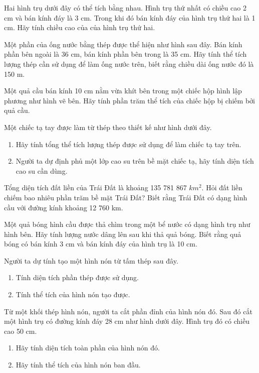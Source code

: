 \documentclass[%
    fontsize=12pt,%
    chapterprefix=false,%
    open=right,%
    twoside=false,%
    numbers=noenddot,%
    headings=optiontohead,%
    final,%
    DIV=15,%
    parskip=half %
]{scrbook}
\begin{document}
\begin{tuluan}
\item Hai hình trụ dưới đây có thể tích bằng nhau. Hình trụ thứ nhất có chiều cao 2 cm và bán kính đáy là 3 cm. Trong khi đó bán kính đáy của hình trụ thứ hai là 1 cm. Hãy tính chiều cao của của hình trụ thứ hai.

\item Một phần của ống nước bằng thép được thể hiện như hình sau đây. Bán kính phần bên ngoài là 36 cm, bán kính phần bên trong là 35 cm. Hãy tính thể tích lượng thép cần sử dụng để làm ống nước trên, biết rằng chiều dài ống nước đó là 150 m.

\item Một quả cầu bán kính 10 cm nằm vừa khít bên trong một chiếc hộp hình lập phương như hình vẽ bên. Hãy tính phần trăm thể tích của chiếc hộp bị chiếm bởi quả cầu.

\item Một chiếc tạ tay được làm từ thép theo thiết kế như hình dưới đây.
\begin{enumerate}[label=\alph*)]
  \item[a)] Hãy tính tổng thể tích lượng thép được sử dụng để làm chiếc tạ tay trên.
  \item[b)] Người ta dự định phủ một lớp cao su trên bề mặt chiếc tạ, hãy tính diện tích cao su cần dùng.
\end{enumerate}

\item Tổng diện tích đất liền của Trái Đất là khoảng 135 781 867 $km^2$. Hỏi đất liền chiếm bao nhiêu phần trăm bề mặt Trái Đất? Biết rằng Trái Đất có dạng hình cầu với đường kính khoảng 12 760 km.

\item Một quả bóng hình cầu được thả chìm trong một bể nước có dạng hình trụ như hình bên. Hãy tính lượng nước dâng lên sau khi thả quả bóng. Biết rằng quả bóng có bán kính 3 cm và bán kính đáy của hình trụ là 10 cm.

\item Người ta dự tính tạo một hình nón từ tấm thép sau đây.
\begin{enumerate}[label=\alph*)]
  \item[a)] Tính diện tích phần thép được sử dụng.
  \item[b)] Tính thể tích của hình nón tạo được.
\end{enumerate}

\item Từ một khối thép hình nón, người ta cắt phần đỉnh của hình nón đó. Sau đó cắt một hình trụ có đường kính đáy 28 cm như hình dưới đây. Hình trụ đó có chiều cao 50 cm.
\begin{enumerate}[label=\alph*)]
  \item[a)] Hãy tính diện tích toàn phần của hình nón đó.
  \item[b)] Hãy tính thể tích của hình nón ban đầu.
\end{enumerate}


\end{tuluan}
\end{document}
